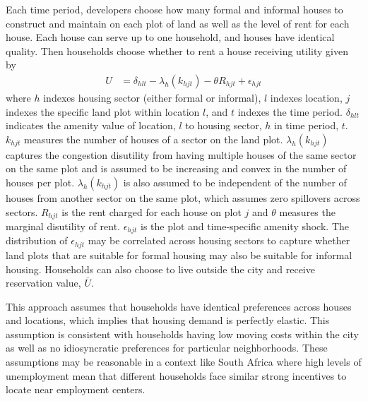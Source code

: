 \documentclass[12pt]{article}
\begin{document}


Each time period, developers choose how many formal and informal houses to construct and maintain on each plot of land as well as the level of rent for each house.  Each house can serve up to one household, and houses have identical quality.  Then households choose whether to rent a house receiving utility given by
\begin{align*}
U &= \delta_{hlt} - \lambda_{h}(k_{hjt}) - \theta R_{hjt}   + \epsilon_{hjt}  
\end{align*}
\noindent where $h$ indexes housing sector (either formal or informal), $l$ indexes location, $j$ indexes the specific land plot within location $l$, and $t$ indexes the time period.  $\delta_{hlt}$ indicates the amenity value of location, $l$ to housing sector, $h$ in time period, $t$.  $k_{hjt}$ measures the number of houses of a sector on the land plot.  $\lambda_{h}(k_{hjt})$ captures the congestion disutility from having multiple houses of the same sector on the same plot and is assumed to be increasing and convex in the number of houses per plot.   $\lambda_{h}(k_{hjt})$ is also assumed to be independent of the number of houses from another sector on the same plot, which assumes zero spillovers across sectors.    $R_{hjt}$ is the rent charged for each house on plot $j$ and $\theta$ measures the marginal disutility of rent.  $\epsilon_{hjt}$ is the plot and time-specific amenity shock.  The distribution of $\epsilon_{hjt}$ may be correlated across housing sectors to capture whether land plots that are suitable for formal housing may also be suitable for informal housing.  Households can also choose to live outside the city and receive reservation value, $\overline{U}$.  

This approach assumes that households have identical preferences across houses and locations, which implies that housing demand is perfectly elastic.  This assumption is consistent with households having low moving costs within the city as well as no idiosyncratic preferences for particular neighborhoods.  These assumptions may be reasonable in a context like South Africa where high levels of unemployment mean that different households face similar strong incentives to locate near employment centers.
 
\end{document}
